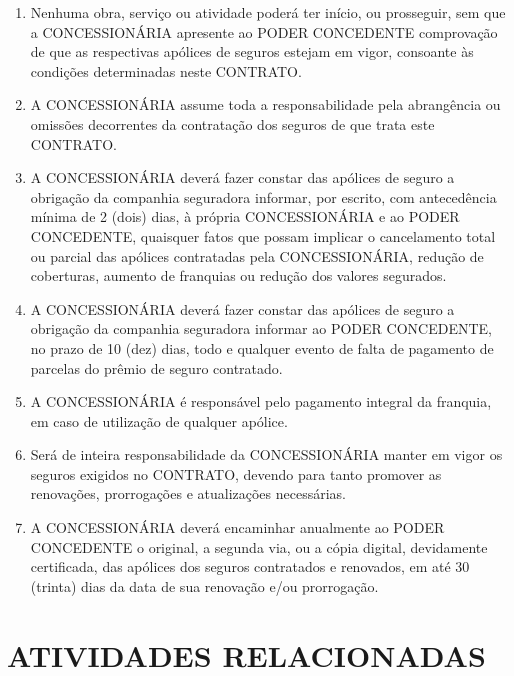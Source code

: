 \documentclass[a4paper,11pt]{report} %
\begin{document}
\begin{enumerate}
\item \label{itm:G7AK} Nenhuma obra, serviço ou atividade poderá ter início, ou prosseguir, sem que a CONCESSIONÁRIA apresente ao PODER CONCEDENTE comprovação de que as respectivas apólices de seguros estejam em vigor, consoante às condições determinadas neste CONTRATO.

\item \label{itm:2R6E} A CONCESSIONÁRIA assume toda a responsabilidade pela abrangência ou omissões decorrentes da contratação dos seguros de que trata este CONTRATO.

\item \label{itm:627L} A CONCESSIONÁRIA deverá fazer constar das apólices de seguro a obrigação da companhia seguradora informar, por escrito, com antecedência mínima de 2 (dois) dias, à própria CONCESSIONÁRIA e ao PODER CONCEDENTE, quaisquer fatos que possam implicar o cancelamento total ou parcial das apólices contratadas pela CONCESSIONÁRIA, redução de coberturas, aumento de franquias ou redução dos valores segurados.

\item \label{itm:GUJ7} A CONCESSIONÁRIA deverá fazer constar das apólices de seguro a obrigação da companhia seguradora informar ao PODER CONCEDENTE, no prazo de 10 (dez) dias, todo e qualquer evento de falta de pagamento de parcelas do prêmio de seguro contratado.

\item \label{itm:4A25} A CONCESSIONÁRIA é responsável pelo pagamento integral da franquia, em caso de utilização de qualquer apólice.

\item \label{itm:9TKJ} Será de inteira responsabilidade da CONCESSIONÁRIA manter em vigor os seguros exigidos no CONTRATO, devendo para tanto promover as renovações, prorrogações e atualizações necessárias.

\item \label{itm:4PT7} A CONCESSIONÁRIA deverá encaminhar anualmente ao PODER CONCEDENTE o original, a segunda via, ou a cópia digital, devidamente certificada, das apólices dos seguros contratados e renovados, em até 30 (trinta) dias da data de sua renovação e/ou prorrogação.

\end{enumerate}

\section{ATIVIDADES RELACIONADAS}
\label{sec:9GLZ}
\end{document}
